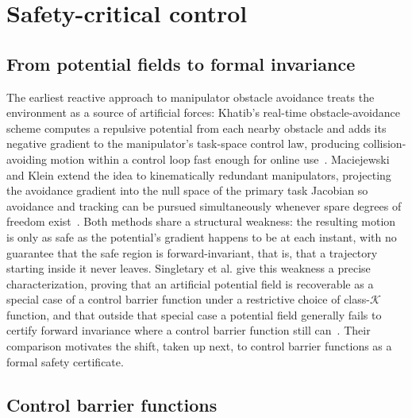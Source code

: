 \documentclass[12pt,a4paper,twoside,openright]{report}
\begin{document}
\section{Safety-critical control}
\label{sec:sota-safety-critical}

\subsection{From potential fields to formal invariance}
\label{sec:sota-potential-fields}

The earliest reactive approach to manipulator obstacle avoidance treats the environment as a source of artificial forces: Khatib's real-time obstacle-avoidance scheme computes a repulsive potential from each nearby obstacle and adds its negative gradient to the manipulator's task-space control law, producing collision-avoiding motion within a control loop fast enough for online use~\cite{khatib1986}. Maciejewski and Klein extend the idea to kinematically redundant manipulators, projecting the avoidance gradient into the null space of the primary task Jacobian so avoidance and tracking can be pursued simultaneously whenever spare degrees of freedom exist~\cite{maciejewski1985obstacle}. Both methods share a structural weakness: the resulting motion is only as safe as the potential's gradient happens to be at each instant, with no guarantee that the safe region is forward-invariant, that is, that a trajectory starting inside it never leaves. Singletary et al. give this weakness a precise characterization, proving that an artificial potential field is recoverable as a special case of a control barrier function under a restrictive choice of class-$\mathcal{K}$ function, and that outside that special case a potential field generally fails to certify forward invariance where a control barrier function still can~\cite{singletary2021comparative}. Their comparison motivates the shift, taken up next, to control barrier functions as a formal safety certificate.

\subsection{Control barrier functions}
\label{sec:sota-cbf}
\end{document}
